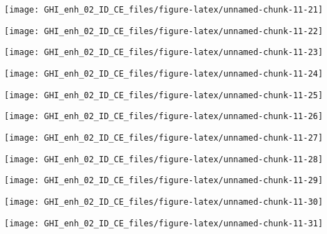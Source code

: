 \documentclass[
  10pt,
  a4paper,oneside]{article}
\begin{document}
\begin{center}\texttt{[image: GHI\_enh\_02\_ID\_CE\_files/figure-latex/unnamed-chunk-11-21]} \end{center}

\begin{center}\texttt{[image: GHI\_enh\_02\_ID\_CE\_files/figure-latex/unnamed-chunk-11-22]} \end{center}

\begin{center}\texttt{[image: GHI\_enh\_02\_ID\_CE\_files/figure-latex/unnamed-chunk-11-23]} \end{center}

\begin{center}\texttt{[image: GHI\_enh\_02\_ID\_CE\_files/figure-latex/unnamed-chunk-11-24]} \end{center}

\begin{center}\texttt{[image: GHI\_enh\_02\_ID\_CE\_files/figure-latex/unnamed-chunk-11-25]} \end{center}

\begin{center}\texttt{[image: GHI\_enh\_02\_ID\_CE\_files/figure-latex/unnamed-chunk-11-26]} \end{center}

\begin{center}\texttt{[image: GHI\_enh\_02\_ID\_CE\_files/figure-latex/unnamed-chunk-11-27]} \end{center}

\begin{center}\texttt{[image: GHI\_enh\_02\_ID\_CE\_files/figure-latex/unnamed-chunk-11-28]} \end{center}

\begin{center}\texttt{[image: GHI\_enh\_02\_ID\_CE\_files/figure-latex/unnamed-chunk-11-29]} \end{center}

\begin{center}\texttt{[image: GHI\_enh\_02\_ID\_CE\_files/figure-latex/unnamed-chunk-11-30]} \end{center}

\begin{center}\texttt{[image: GHI\_enh\_02\_ID\_CE\_files/figure-latex/unnamed-chunk-11-31]} \end{center}
\end{document}
